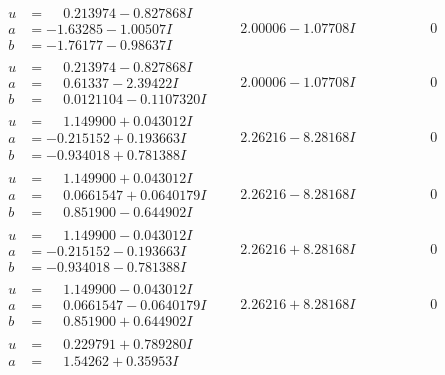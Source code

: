 \documentclass[1p]{elsarticle_modified}
\theoremstyle{definition}
\begin{document}
$$\begin{array}{c|c|c}
\begin{aligned}
u &= \phantom{-}0.213974 - 0.827868 I \\
a &= -1.63285 - 1.00507 I \\
b &= -1.76177 - 0.98637 I\end{aligned}
 & \phantom{-}2.00006 - 1.07708 I & \phantom{-0.000000 } 0 \\ \hline\begin{aligned}
u &= \phantom{-}0.213974 - 0.827868 I \\
a &= \phantom{-}0.61337 - 2.39422 I \\
b &= \phantom{-}0.0121104 - 0.1107320 I\end{aligned}
 & \phantom{-}2.00006 - 1.07708 I & \phantom{-0.000000 } 0 \\ \hline\begin{aligned}
u &= \phantom{-}1.149900 + 0.043012 I \\
a &= -0.215152 + 0.193663 I \\
b &= -0.934018 + 0.781388 I\end{aligned}
 & \phantom{-}2.26216 - 8.28168 I & \phantom{-0.000000 } 0 \\ \hline\begin{aligned}
u &= \phantom{-}1.149900 + 0.043012 I \\
a &= \phantom{-}0.0661547 + 0.0640179 I \\
b &= \phantom{-}0.851900 - 0.644902 I\end{aligned}
 & \phantom{-}2.26216 - 8.28168 I & \phantom{-0.000000 } 0 \\ \hline\begin{aligned}
u &= \phantom{-}1.149900 - 0.043012 I \\
a &= -0.215152 - 0.193663 I \\
b &= -0.934018 - 0.781388 I\end{aligned}
 & \phantom{-}2.26216 + 8.28168 I & \phantom{-0.000000 } 0 \\ \hline\begin{aligned}
u &= \phantom{-}1.149900 - 0.043012 I \\
a &= \phantom{-}0.0661547 - 0.0640179 I \\
b &= \phantom{-}0.851900 + 0.644902 I\end{aligned}
 & \phantom{-}2.26216 + 8.28168 I & \phantom{-0.000000 } 0 \\ \hline\begin{aligned}
u &= \phantom{-}0.229791 + 0.789280 I \\
a &= \phantom{-}1.54262 + 0.35953 I \\

\end{aligned}
\end{array}$$
\end{document}
